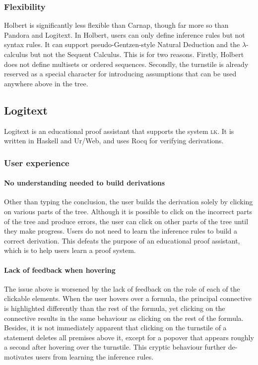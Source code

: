 
\subsubsection{Flexibility}
Holbert is significantly less flexible than Carnap, though far more so than Pandora and Logitext. In Holbert, users can only define inference rules but not syntax rules. It can support pseudo-Gentzen-style Natural Deduction and the $\lambda$-calculus but not the Sequent Calculus. This is for two reasons. Firstly, Holbert does not define multisets or ordered sequences. Secondly, the turnstile is already reserved as a special character for introducing assumptions that can be used anywhere above in the tree.

\subsection{Logitext}
Logitext \cite{yang:2022} is an educational proof assistant that supports the system \textsc{lk}. It is written in Haskell and Ur/Web, and uses Rocq for verifying derivations.
\subsubsection{User experience}
\paragraph{No understanding needed to build derivations}
Other than typing the conclusion, the user builds the derivation solely by clicking on various parts of the tree. Although it is possible to click on the incorrect parts of the tree and produce errors, the user can click on other parts of the tree until they make progress. Users do not need to learn the inference rules to build a correct derivation. This defeats the purpose of an educational proof assistant, which is to help users learn a proof system.

\paragraph{Lack of feedback when hovering}
The issue above is worsened by the lack of feedback on the role of each of the clickable elements. When the user hovers over a formula, the principal connective is highlighted differently than the rest of the formula, yet clicking on the connective results in the same behaviour as clicking on the rest of the formula. Besides, it is not immediately apparent that clicking on the turnstile of a statement deletes all premises above it, except for a popover that appears roughly a second after hovering over the turnstile. This cryptic behaviour further de-motivates users from learning the inference rules.

